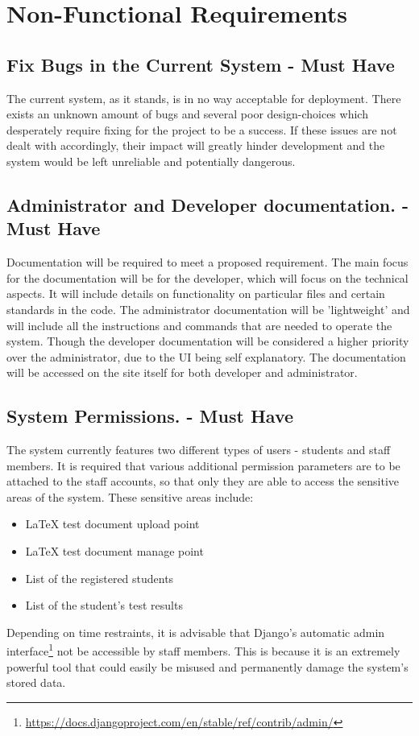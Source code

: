 \documentclass[12pt]{article}
\begin{document}
	\newpage
	
	\section{Non-Functional Requirements}
	\subsection{Fix Bugs in the Current System - Must Have}
	The current system, as it stands, is in no way acceptable for deployment. There exists an unknown amount of bugs and several poor design-choices which desperately require fixing for the project to be a success. If these issues are not dealt with accordingly, their impact will greatly hinder development and the system would be left unreliable and potentially dangerous.
	\subsection{Administrator and Developer documentation. - Must Have}
	Documentation will be required to meet a proposed requirement. The main focus for the documentation will be for the developer, which will focus on the technical aspects. It will include details on functionality on particular files and certain standards in the code. The administrator documentation will be 'lightweight' and will include all the instructions and commands that are needed to operate the system. Though the developer documentation will be considered a higher priority over the administrator, due to the UI being self explanatory. The documentation will be accessed on the site itself for both developer and administrator. 
	\subsection{System Permissions. - Must Have}
	The system currently features two different types of users - students and staff members. It is required that various additional permission parameters are to be attached to the staff accounts, so that only they are able to access the sensitive areas of the system. These sensitive areas include:
	\begin{itemize}  
        \item LaTeX test document upload point
        \item LaTeX test document manage point
        \item List of the registered students
        \item List of the student's test results
    \end{itemize}
    Depending on time restraints, it is advisable that Django's automatic admin interface\footnote{\url{https://docs.djangoproject.com/en/stable/ref/contrib/admin/}} not be accessible by staff members. This is because it is an extremely powerful tool that could easily be misused and permanently damage the system's stored data.
\end{document}
